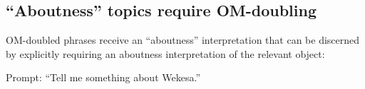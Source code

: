 \documentclass[output=paper]{langscibook}
\begin{document}









\subsection{``Aboutness'' topics require OM-doubling}
OM-doubled phrases receive an ``aboutness'' interpretation that can be discerned by explicitly requiring an aboutness interpretation of the relevant object: 

\ea Prompt: ``Tell me something about Wekesa.''\\

\end{document}
